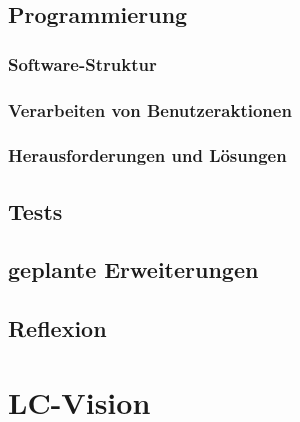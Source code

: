 \documentclass[10pt,a4paper]{article}
\begin{document}
\subsection{Programmierung}
\subsubsection{Software-Struktur}
\subsubsection{Verarbeiten von Benutzeraktionen}
\subsubsection{Herausforderungen und Lösungen}
\subsection{Tests}
\subsection{geplante Erweiterungen}
\subsection{Reflexion}

\section{LC-Vision}
\end{document}
